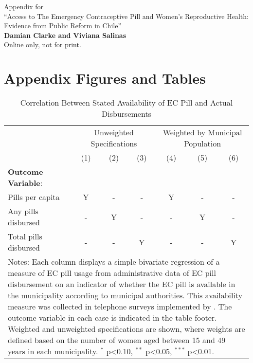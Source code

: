 \documentclass[12pt]{article}
\begin{document}
\clearpage
\appendix
\renewcommand{\thetable}{A\arabic{table}}
\setcounter{table}{0}
\renewcommand{\thefigure}{A\arabic{figure}}
\setcounter{figure}{0}
\renewcommand{\thepage}{A\arabic{page}}
%

\begin{spacing}{2}
\begin{center}
{    \large Appendix for \vspace{4mm} \\
}
  {\LARGE
    ``Access to The Emergency Contraceptive Pill and Women's Reproductive Health: Evidence from Public Reform in Chile''
  } \vspace{4mm} \\
  {
    \large
    \textbf{Damian Clarke and Viviana Salinas}
    \vspace{4mm} \\
    Online only, not for print.
    }
\end{center}
\end{spacing}




\section{Appendix Figures and Tables}
\begin{table}[htpb!]
  \centering
  \caption{Correlation Between Stated Availability of EC Pill and Actual Disbursements}
    \label{tab:corrPills}
    \begin{tabular}{lcccccc}\toprule
      &\multicolumn{3}{c}{Unweighted Specifications} &\multicolumn{3}{c}{Weighted by Municipal Population} \\ \cmidrule(r){2-4}\cmidrule(r){5-7}
      &(1)&(2)&(3)&(4)&(5)&(6) \\ \midrule
      
      \midrule
      {\bf Outcome Variable}: &&&&&&\\
      Pills per capita      & Y & - & - & Y & - & - \\
      Any pills disbursed   & - & Y & - & - & Y & - \\
      Total pills disbursed & - & - & Y & - & - & Y \\
      \bottomrule
      \multicolumn{7}{p{16.1cm}}{{\footnotesize Notes: Each column displays a simple bivariate regression of a measure of EC pill usage from administrative data of EC pill disbursement on an indicator of whether the EC pill is available in the municipality according to municipal authorities.  This availability measure was collected in telephone surveys implemented by \citet{Didesetal2009,Didesetal2010,Didesetal2011}. The outcome variable in each case is indicated in the table footer.  Weighted and unweighted specifications are shown, where weights are defined based on the number of women aged between 15 and 49 years in each municipality. $^{*}$ p<0.10, $^{**}$ p<0.05, $^{***}$ p<0.01.}}
    \end{tabular}
\end{table}
\end{document}
